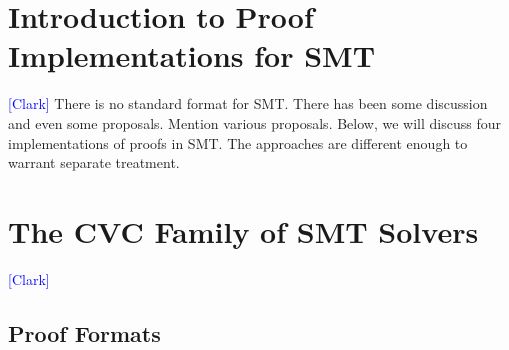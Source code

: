 \documentclass{llncs}
\newcommand{\Note}[1]{\textcolor{blue}{[#1]}}
\begin{document}







\section{Introduction to Proof Implementations for SMT}
\label{sec:format}

\Note{Clark}
There is no standard format for SMT.  There has been some discussion and even
some proposals.  Mention various proposals.  Below, we will discuss four
implementations of proofs in SMT.  The approaches are different enough to
warrant separate treatment.

\section{The CVC Family of SMT Solvers}
\Note{Clark}
\subsection{Proof Formats}
\end{document}

